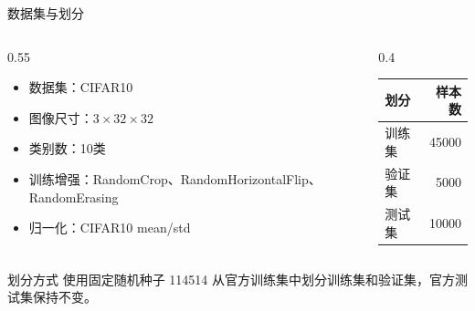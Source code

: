 \documentclass[aspectratio=169,10pt]{ctexbeamer}
\begin{document}
\begin{frame}{数据集与划分}
	\begin{columns}[T,onlytextwidth]
		\begin{column}{0.55\textwidth}
			\begin{itemize}
				\item 数据集：CIFAR10
				\item 图像尺寸：$3\times 32\times 32$
				\item 类别数：10类
				\item 训练增强：RandomCrop、RandomHorizontalFlip、RandomErasing
				\item 归一化：CIFAR10 mean/std
			\end{itemize}
		\end{column}
		\begin{column}{0.4\textwidth}
			\begin{table}
				\centering
				\begin{tabular}{l r}
					\toprule
					划分 & 样本数 \\
					\midrule
					训练集 & 45000 \\
					验证集 & 5000 \\
					测试集 & 10000 \\
					\bottomrule
				\end{tabular}
			\end{table}
		\end{column}
	\end{columns}

	\vspace{0.25cm}
	\begin{block}{划分方式}
		使用固定随机种子 114514 从官方训练集中划分训练集和验证集，官方测试集保持不变。
	\end{block}
\end{frame}
\end{document}
